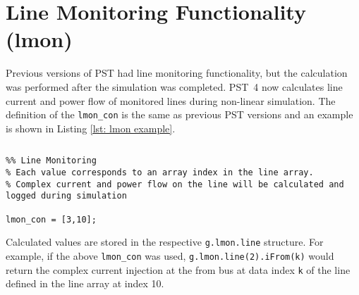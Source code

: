 \section{Line Monitoring Functionality (lmon)}  
Previous versions of PST had line monitoring functionality, but the calculation was performed after the simulation was completed.
\mbox{PST 4} now calculates line current and power flow of monitored lines during non-linear simulation.
The definition of the \verb|lmon_con| is the same as previous PST versions and an example is shown in Listing \ref{lst: lmon example}.

\begin{lstlisting}[caption={Line Monitoring Definition Example},label={lst: lmon example}]
\end{lstlisting}\vspace{-2 em}
\begin{verbatim}
%% Line Monitoring
% Each value corresponds to an array index in the line array.
% Complex current and power flow on the line will be calculated and logged during simulation

lmon_con = [3,10]; 
\end{verbatim}
\noindent Calculated values are stored in the respective \verb|g.lmon.line| structure.
For example, if the above \verb|lmon_con| was used, \verb|g.lmon.line(2).iFrom(k)| would return the complex current injection at the from bus at data index \verb|k| of the line defined in the line array at index 10.